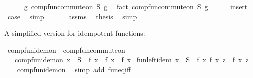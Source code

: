 \begin{isabellebody}
\ \ \ \ \isamarkupfalse%
\ g{\isacharcolon}{\kern0pt}\ comp{\isacharunderscore}{\kern0pt}fun{\isacharunderscore}{\kern0pt}commute{\isacharunderscore}{\kern0pt}on\ S\ g\ \isamarkupfalse%
\ {\isacharparenleft}{\kern0pt}fact\ {\isacartoucheopen}comp{\isacharunderscore}{\kern0pt}fun{\isacharunderscore}{\kern0pt}commute{\isacharunderscore}{\kern0pt}on\ S\ g{\isacartoucheclose}{\isacharparenright}{\kern0pt}\isanewline
\ \ \ \ \isamarkupfalse%
\ insert\ \isamarkupfalse%
\ {\isacharquery}{\kern0pt}case\ \isamarkupfalse%
\ simp\isanewline
\ \ \isamarkupfalse%
\isanewline
\ \ \isamarkupfalse%
\ assms\ \isamarkupfalse%
\ {\isacharquery}{\kern0pt}thesis\ \isamarkupfalse%
\ simp\isanewline
{}\isamarkupfalse%
%
\endisatagproof
{\isafoldproof}%
%
\isadelimproof
%
\endisadelimproof
%
\begin{isamarkuptext}%
A simplified version for idempotent functions:%
\end{isamarkuptext}\isamarkuptrue%
\isamarkupfalse%
\ comp{\isacharunderscore}{\kern0pt}fun{\isacharunderscore}{\kern0pt}idem{\isacharunderscore}{\kern0pt}on\ {\isacharequal}{\kern0pt}\ comp{\isacharunderscore}{\kern0pt}fun{\isacharunderscore}{\kern0pt}commute{\isacharunderscore}{\kern0pt}on\ {\isacharplus}{\kern0pt}\isanewline
\ \ \ comp{\isacharunderscore}{\kern0pt}fun{\isacharunderscore}{\kern0pt}idem{\isacharunderscore}{\kern0pt}on{\isacharcolon}{\kern0pt}\ {\isachardoublequoteopen}x\ {\isasymin}\ S\ {\isasymLongrightarrow}\ f\ x\ {\isasymcirc}\ f\ x\ {\isacharequal}{\kern0pt}\ f\ x{\isachardoublequoteclose}\isanewline
{}\isanewline
\isanewline
{}\isamarkupfalse%
\ fun{\isacharunderscore}{\kern0pt}left{\isacharunderscore}{\kern0pt}idem{\isacharcolon}{\kern0pt}\ {\isachardoublequoteopen}x\ {\isasymin}\ S\ {\isasymLongrightarrow}\ f\ x\ {\isacharparenleft}{\kern0pt}f\ x\ z{\isacharparenright}{\kern0pt}\ {\isacharequal}{\kern0pt}\ f\ x\ z{\isachardoublequoteclose}\isanewline
%
\isadelimproof
\ \ %
\endisadelimproof
%
\isatagproof
{}\isamarkupfalse%
\ comp{\isacharunderscore}{\kern0pt}fun{\isacharunderscore}{\kern0pt}idem{\isacharunderscore}{\kern0pt}on\ \isamarkupfalse%
\ {\isacharparenleft}{\kern0pt}simp\ add{\isacharcolon}{\kern0pt}\ fun{\isacharunderscore}{\kern0pt}eq{\isacharunderscore}{\kern0pt}iff{\isacharparenright}{\kern0pt}%
\endisatagproof
{\isafoldproof}%
%
\isadelimproof

\end{isabellebody}
